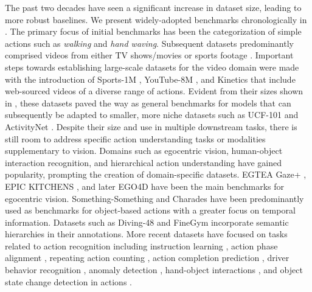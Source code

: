The past two decades have seen a significant increase in dataset size, leading to more robust baselines. We present widely-adopted benchmarks chronologically in . The primary focus of initial benchmarks  has been the categorization of simple actions such as \emph{walking} and \emph{hand waving}. Subsequent datasets predominantly comprised videos from either TV shows/movies  or sports footage . Important steps towards establishing large-scale datasets for the video domain were made with the introduction of Sports-1M , YouTube-8M , and Kinetics  that include web-sourced videos of a diverse range of actions. Evident from their sizes shown in , these datasets paved the way as general benchmarks for models that can subsequently be adapted to smaller, more niche datasets such as UCF-101  and ActivityNet . Despite their size and use in multiple downstream tasks, there is still room to address specific action understanding tasks or modalities supplementary to vision. Domains such as 
egocentric vision, human-object interaction recognition, and hierarchical action understanding have gained popularity, prompting the creation of domain-specific datasets. EGTEA Gaze+ , EPIC KITCHENS , and later EGO4D  have been the main benchmarks for egocentric vision. Something-Something  and Charades  have been predominantly used as benchmarks for object-based actions with a greater focus on temporal information. Datasets such as Diving-48  and FineGym  incorporate semantic hierarchies in their annotations. More recent datasets have focused on tasks related to action recognition including instruction learning , action phase alignment , repeating action counting , action completion prediction , driver behavior recognition , anomaly detection , hand-object interactions , and object state change detection in actions . 



